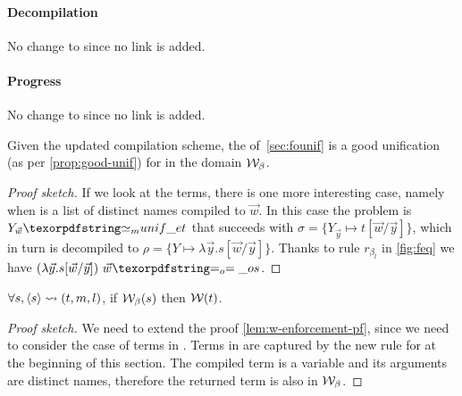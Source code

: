 
\paragraph*{Decompilation}
No change
to 
since no link is added.

\paragraph*{Progress}
No change to  since no link is added.

\begin{lemma}\label{prop:uniffowb}
  Given the updated compilation scheme, the \Uo of~\cref{sec:founif}
  is a good unification (as per \cref{prop:good-unif})
  for \Eo in the domain $\mathcal{W}_\beta$.
\end{lemma}

\begin{proof}[Proof sketch]
  If we look at the \Fo{} terms, there is one more interesting case,
  namely  when 
  is a list of distinct names compiled to $\vec{w}$. In this case
  the \Ho problem is $Y_{\vec{w}} \Ue t$ that succeeds with
   $\sigma = \{ Y_{\vec{y}} \mapsto t[\vec{w}/\vec{y}]\}$, which in turn
   is decompiled to $\rho = \{ Y \mapsto \lambda \vec{y}.s[\vec{w}/\vec{y}]\}$.
   Thanks to rule $r_{\beta_l}$ in \cref{fig:feq} we have
   $(\lambda \vec{y}.s[\vec{w}/\vec{y}])~\vec{w} \Eo s$.
\end{proof}
  
\begin{lemma}\label{lem:w-enforcement-maybebeta}
  $\forall s, \langle s \rangle\rightsquigarrow(t,m,l)$, if $\mathcal{W}_\beta(s)$  then $\mathcal{W}(t)$.
\end{lemma}

\begin{proof}[Proof sketch]
  We need to extend the proof \cref{lem:w-enforcement-pf}, since we need to
  consider the case of terms in \maybebeta. Terms in \maybebeta are captured by
  the new rule for  at the beginning of this section. The compiled
  term is a variable and its arguments are distinct names, therefore the
  returned term is also in $\mathcal{W}_\beta$.
\end{proof}

